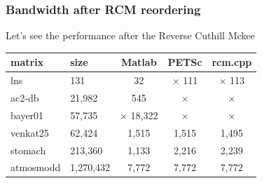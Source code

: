 \documentclass{beamer}
\begin{document}
\begin{frame}
\frametitle{Bandwidth after RCM reordering}

Let's see the performance after the Reverse Cuthill Mckee

\begin{center}
\begin{tabular}{| l | l | c  c  c}
\hline

    matrix           & size         &    Matlab & PETSc     &  rcm.cpp        \\
 \hline
 lns                   & 131             &     32        &       \color{red} $\times$ 111         & \color{red} $\times$ 113  \\
 ac2-db            & 21,982     &         545       &     \color{red} $\times$            &  \color{red} $\times$  \\
 bayer01           & 57,735      &     \color{red} $\times$ 18,322        &     \color{red} $\times$     &  \color{red} $\times$   \\
 venkat25         & 62,424      &     1,515        &    1,515    & 1,495                   \\
 stomach          & 213,360    &      1,133      & 2,216 & 2,239                    \\
 atmosmodd     & 1,270,432 &    7,772       & 7,772&  7,772                   \\
 \hline

\end{tabular}
\end{center}


\end{frame}


\end{document}

